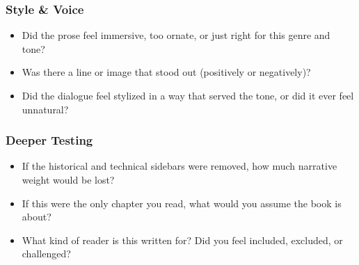 \subsubsection{Style \& Voice}

\begin{itemize}
\item Did the prose feel immersive, too ornate, or just right for this genre and tone?
\item Was there a line or image that stood out (positively or negatively)?
\item Did the dialogue feel stylized in a way that served the tone, or did it ever feel unnatural?
\end{itemize}

\subsubsection{Deeper Testing}

\begin{itemize}
\item If the historical and technical sidebars were removed, how much narrative weight would be lost?
\item If this were the only chapter you read, what would you assume the book is about?
\item What kind of reader is this written for? Did you feel included, excluded, or challenged?
\end{itemize}




